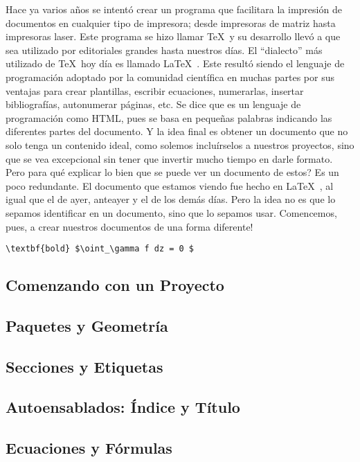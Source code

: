 \documentclass[10pt,letterpaper]{article}
\newenvironment{Code}
{
\begin{lrbox}{\selvestebox}%
\begin{minipage}{\dimexpr\columnwidth-2\fboxsep\relax}
\fontfamily{\ttdefault}\selectfont
}
{\end{minipage}\end{lrbox}%
\begin{center}
\colorbox{light-gray}{\usebox{\selvestebox}}
\end{center}
}
\begin{document}
Hace ya varios a\~nos se intent\'o crear un programa que facilitara la impresi\'on de documentos en cualquier tipo de impresora; desde impresoras de matriz hasta impresoras laser. Este programa se hizo llamar \TeX\ y su desarrollo llev\'o a que sea utilizado por editoriales grandes hasta nuestros d\'ias. El ``dialecto'' m\'as utilizado de \TeX\ hoy d\'ia es llamado \LaTeX\ . Este result\'o siendo el lenguaje de programaci\'on adoptado por la comunidad cient\'ifica en muchas partes por sus ventajas para crear plantillas, escribir ecuaciones, numerarlas, insertar bibliograf\'ias, autonumerar p\'aginas, etc. Se dice que es un lenguaje de programaci\'on como HTML, pues se basa en peque\~nas palabras indicando las diferentes partes del documento. Y la idea final es obtener un documento que no solo tenga un contenido ideal, como solemos inclu\'irselos a nuestros proyectos, sino que se vea excepcional sin tener que invertir mucho tiempo en darle formato. Pero para qu\'e explicar lo bien que se puede ver un documento de estos? Es un poco redundante. El documento que estamos viendo fue hecho en \LaTeX\ , al igual que el de ayer, anteayer y el de los dem\'as d\'ias. Pero la idea no es que lo sepamos identificar en un documento, sino que lo sepamos usar. Comencemos, pues, a crear nuestros documentos de una forma diferente!

\begin{Code}
\begin{verbatim}
\textbf{bold} $\oint_\gamma f dz = 0 $
\end{verbatim}
\end{Code}

\subsection{Comenzando con un Proyecto}
\subsection{Paquetes y Geometr\'ia}
\subsection{Secciones y Etiquetas}
\subsection{Autoensablados: \'Indice y T\'itulo}
\subsection{Ecuaciones y F\'ormulas}
\end{document}

